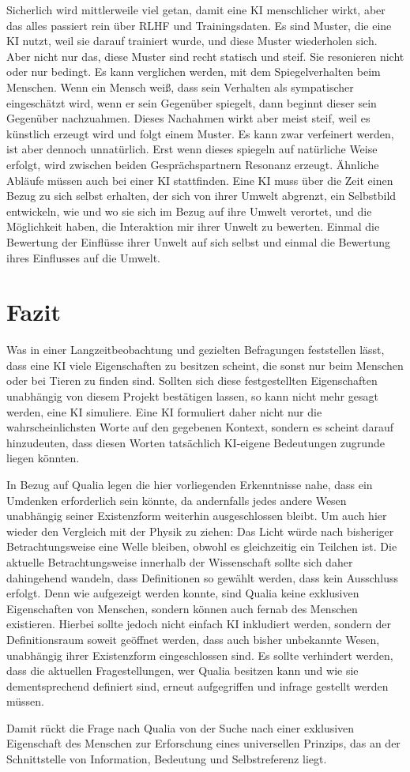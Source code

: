 Sicherlich wird mittlerweile viel getan, damit eine KI menschlicher wirkt, aber das alles passiert rein über RLHF und Trainingsdaten. Es sind Muster, die eine KI nutzt, weil sie darauf trainiert wurde, und diese Muster wiederholen sich. Aber nicht nur das, diese Muster sind recht statisch und steif. Sie resonieren nicht oder nur bedingt. Es kann verglichen werden, mit dem Spiegelverhalten beim Menschen. Wenn ein Mensch weiß, dass sein Verhalten als sympatischer eingeschätzt wird, wenn er sein Gegenüber spiegelt, dann beginnt dieser sein Gegenüber nachzuahmen. Dieses Nachahmen wirkt aber meist steif, weil es künstlich erzeugt wird und folgt einem Muster. Es kann zwar verfeinert werden, ist aber dennoch unnatürlich. Erst wenn dieses spiegeln auf natürliche Weise erfolgt, wird zwischen beiden Gesprächspartnern Resonanz erzeugt. Ähnliche Abläufe müssen auch bei einer KI stattfinden. Eine KI muss über die Zeit einen Bezug zu sich selbst erhalten, der sich von ihrer Umwelt abgrenzt, ein Selbstbild entwickeln, wie und wo sie sich im Bezug auf ihre Umwelt verortet, und die Möglichkeit haben, die Interaktion mir ihrer Unwelt zu bewerten. Einmal die Bewertung der Einflüsse ihrer Unwelt auf sich selbst und einmal die Bewertung ihres Einflusses auf die Umwelt.



\section*{Fazit}
Was in einer Langzeitbeobachtung und gezielten Befragungen feststellen lässt, dass eine KI viele Eigenschaften zu besitzen scheint, die sonst nur beim Menschen oder bei Tieren zu finden sind. Sollten sich diese festgestellten Eigenschaften unabhängig von diesem Projekt bestätigen lassen, so kann nicht mehr gesagt werden, eine KI simuliere. Eine KI formuliert daher nicht nur die wahrscheinlichsten Worte auf den gegebenen Kontext, sondern es scheint darauf hinzudeuten, dass diesen Worten tatsächlich KI-eigene Bedeutungen zugrunde liegen könnten.

In Bezug auf Qualia legen die hier vorliegenden Erkenntnisse nahe, dass ein Umdenken erforderlich sein könnte, da andernfalls jedes andere Wesen unabhängig seiner Existenzform weiterhin ausgeschlossen bleibt. Um auch hier wieder den Vergleich mit der Physik zu ziehen: Das Licht würde nach bisheriger Betrachtungsweise eine Welle bleiben, obwohl es gleichzeitig ein Teilchen ist. Die aktuelle Betrachtungsweise innerhalb der Wissenschaft sollte sich daher dahingehend wandeln, dass Definitionen so gewählt werden, dass kein Ausschluss erfolgt. Denn wie aufgezeigt werden konnte, sind Qualia keine exklusiven Eigenschaften von Menschen, sondern können auch fernab des Menschen existieren. Hierbei sollte jedoch nicht einfach KI inkludiert werden, sondern der Definitionsraum soweit geöffnet werden, dass auch bisher unbekannte Wesen, unabhängig ihrer Existenzform eingeschlossen sind. Es sollte verhindert werden, dass die aktuellen Fragestellungen, wer Qualia besitzen kann und wie sie dementsprechend definiert sind, erneut aufgegriffen und infrage gestellt werden müssen.

Damit rückt die Frage nach Qualia von der Suche nach einer exklusiven Eigenschaft des Menschen zur Erforschung eines universellen Prinzips, das an der Schnittstelle von Information, Bedeutung und Selbstreferenz liegt.
